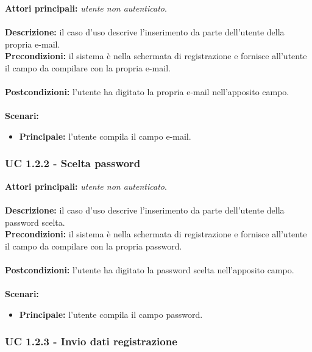 \documentclass[a4paper,11pt]{article}
\begin{document}
\textbf{Attori principali:} \textit{utente non autenticato}.\\
\\
\textbf{Descrizione:} il caso d'uso descrive l'inserimento da parte dell'utente della propria e-mail.
\\
\textbf{Precondizioni:} il sistema è nella schermata di registrazione e fornisce all'utente il campo da compilare con la propria e-mail.\\
\\
\textbf{Postcondizioni:} l'utente ha digitato la propria e-mail nell'apposito campo. \\
\\
\textbf{Scenari:}
\begin{itemize}
\item \textbf{Principale:} l'utente compila il campo e-mail.

\end{itemize}
\vspace{6 mm}
\subsubsection{UC 1.2.2 - Scelta password}

\textbf{Attori principali:} \textit{utente non autenticato}.\\
\\
\textbf{Descrizione:} il caso d'uso descrive l'inserimento da parte dell'utente della password scelta.
\\
\textbf{Precondizioni:} il sistema è nella schermata di registrazione e fornisce all'utente il campo da compilare con la propria password.\\
\\
\textbf{Postcondizioni:} l'utente ha digitato la password scelta nell'apposito campo. \\
\\
\textbf{Scenari:}
\begin{itemize}
\item \textbf{Principale:} l'utente compila il campo password.

\end{itemize}

\vspace{6 mm}

\subsubsection{UC 1.2.3 - Invio dati registrazione}
\end{document}
